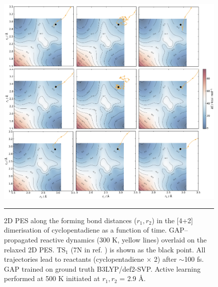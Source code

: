 \documentclass[../../main.tex]{subfiles}
\begin{document}
\begin{figure}[h!]
	\vspace{0.4cm}
	\centering
	\includegraphics[width=\textwidth]{6/gap/figs_si/fig18}
	\vspace{0.2cm}
	\hrule
	\caption{2D PES along the forming bond distances ($r_1, r_2$) in the [4+2] dimerisation of cyclopentadiene as a function of time. GAP–propagated reactive dynamics (300 K, yellow lines) overlaid on the relaxed 2D PES. TS$_1$ (7N in ref. \cite{Caramella2002}) is shown as the black point. All trajectories lead to reactants (cyclopentadiene $\times$ 2) after $\sim$100 fs. GAP trained on ground truth B3LYP/def2-SVP. Active learning performed at 500 K initiated at $r_1, r_2$ = 2.9 \AA.}
	\label{fig::ml_si_18}
\end{figure}
\end{document}
